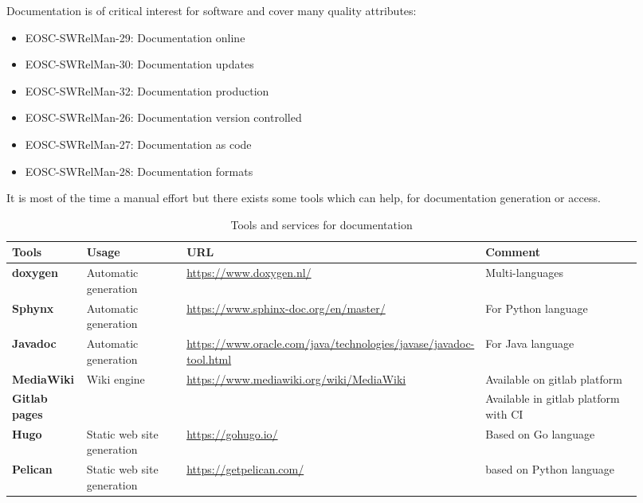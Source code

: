 Documentation is of critical interest for software and cover many
quality attributes: 

\begin{itemize}
  \item EOSC-SWRelMan-29: Documentation online
  \item EOSC-SWRelMan-30: Documentation updates
  \item EOSC-SWRelMan-32: Documentation production
  \item EOSC-SWRelMan-26: Documentation version controlled
  \item EOSC-SWRelMan-27: Documentation as code
  \item EOSC-SWRelMan-28: Documentation formats
\end{itemize}

It is most of the time a manual effort but there exists some tools
which can help, for documentation generation or access.

\begin{center}
\begin{table}

  \label{tab:tools_pack}
  \small
  \begin{tabular}{|p{0.12\linewidth}|p{0.2\linewidth}|p{0.25\linewidth}|p{0.35\linewidth}|} \hline

    \textbf{Tools} & \textbf{Usage} & \textbf{URL} & \textbf{Comment} \\ \hline \hline
    \textbf{doxygen} & Automatic generation & \url{https://www.doxygen.nl/}
    & Multi-languages \\ \hline
    \textbf{Sphynx} & Automatic generation & \url{https://www.sphinx-doc.org/en/master/}
    & For Python language \\ \hline
    \textbf{Javadoc} & Automatic generation & \url{https://www.oracle.com/java/technologies/javase/javadoc-tool.html}
    & For Java language  \\ \hline
    \textbf{MediaWiki} & Wiki engine & \url{https://www.mediawiki.org/wiki/MediaWiki}
    &  Available on gitlab platform \\ \hline
    \textbf{Gitlab pages} &  & \url{}
    & Available in gitlab platform with CI  \\ \hline
    \textbf{Hugo} & Static web site generation & \url{https://gohugo.io/}
    &   Based on Go language \\ \hline
    \textbf{Pelican} & Static web site generation & \url{https://getpelican.com/}
    &  based on Python language \\ \hline

  \end{tabular}
  \caption{Tools and services for documentation}
\end{table}
\end{center}

